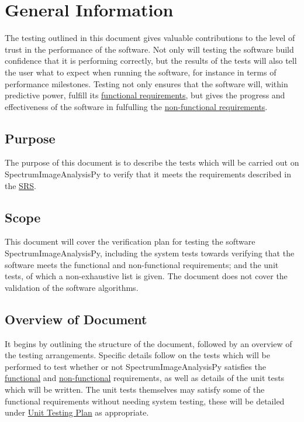 \documentclass[12pt, titlepage]{article}
\newcommand{\progname}{SpectrumImageAnalysisPy}
\begin{document}
\section{General Information}
The testing outlined in this document gives valuable contributions to the level of trust in the performance of the software. Not only will testing the software build confidence that it is performing correctly, but the results of the tests will also tell the user what to expect when running the software, for instance in terms of performance milestones. Testing not only ensures that the software will, within predictive power, fulfill its \hyperref[subsec:FR]{functional requirements}, but gives the progress and effectiveness of the software in fulfulling the \hyperref[subsec:NfR]{non-functional requirements}.


\subsection{Purpose}
The purpose of this document is to describe the tests which will be carried out on \progname{} to verify that it meets the requirements described in the \hyperref[doc:SRS]{SRS}.

\subsection{Scope}
This document will cover the verification plan for testing the software \progname{}, including the system tests towards verifying that the software meets the functional and non-functional requirements; and the unit tests, of which a non-exhaustive list is given. The document does not cover the validation of the software algorithms. 

\subsection{Overview of Document}
 It begins by outlining the structure of the document, followed by an overview of the testing arrangements. Specific details follow on the tests which will be performed to test whether or not \progname{} satisfies the \hyperref[subsec:FuncReqTest]{functional} and \hyperref[subsec:NonfuncReqTest]{non-functional} requirements, as well as details of the unit tests which will be written. The unit tests themselves may satisfy some of the functional requirements without needing system testing, these will be detailed under \hyperref[sec:UnitTest]{Unit Testing Plan} as appropriate.
\end{document}
